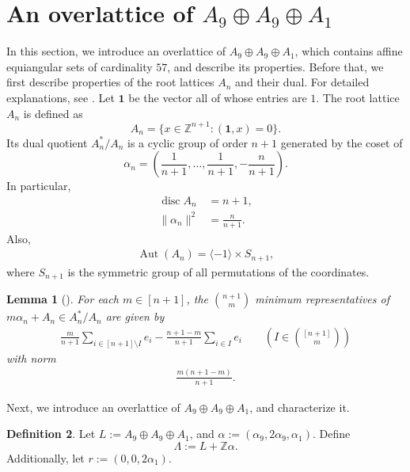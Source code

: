 \documentclass[reqno, 11pt]{amsart}
\numberwithin{equation}{section}
\newtheorem{lem}{Lemma}[section]
\theoremstyle{definition}
\newtheorem{dfn}[lem]{Definition}%
\DeclareMathOperator{\Aut}{Aut}
\DeclareMathOperator{\disc}{disc}
\newcommand{\Z}{\mathbb{Z}}
\newcommand{\allone}{\mathbf{1}}
\newcommand{\inp}[1]{( #1 )}
\begin{document}
\section{An overlattice of $A_9\oplus A_9\oplus A_1$}	\label{sec:Lambda}
In this section, we introduce an overlattice of $A_9\oplus A_9\oplus A_1$, which contains affine equiangular sets of cardinality $57$, and describe its properties.
Before that, we first describe properties of the root lattices $A_n$ and their dual.
For detailed explanations, see \cite{Conway1999, Ozeki2018}.
Let $\allone$ be the vector all of whose entries are $1$.
The root lattice $A_n$ is defined as
\[A_n=\{x\in\Z^{n+1} : \inp{\allone,x}=0\}.\]
Its dual quotient $A_n^*/A_n$ is a cyclic group of order $n+1$
generated by the coset of
\[\alpha_n=\left(\frac{1}{n+1},\dots,\frac{1}{n+1},-\frac{n}{n+1}\right).\]
In particular,
\begin{align}
	\disc A_n      & =n+1,\label{1A}               \\
	\|\alpha_n\|^2 & =\frac{n}{n+1}.\label{1alpha}
\end{align}
Also,
\begin{align}	\label{AutA}
	\Aut(A_n) = \langle -1 \rangle \times S_{n+1},
\end{align}
where $S_{n+1}$ is the symmetric group of all permutations of the coordinates.
\begin{lem}[\cite{Ozeki2018}] \label{lem:minA}
	For each $m \in [n+1]$, the $\binom{n+1}{m}$ minimum representatives of $m \alpha_n + A_n \in A_n^*/A_n$ are given by
	\begin{align}	\label{enum_min}
		\frac{m}{n+1} \sum_{i \in [n+1] \setminus I} e_i-\frac{n+1-m}{n+1} \sum_{i \in I} e_i \qquad ( I \in \binom{[n+1]}{m} )
	\end{align}
	with norm
	\begin{align} \label{min}
		\frac{m(n+1-m)}{n+1}.
	\end{align}
\end{lem}



Next, we introduce an overlattice of $A_9\oplus A_9\oplus A_1$, and characterize it.
\begin{dfn}	\label{dfn:Lambda}
	Let $L:=A_9\oplus A_9\oplus A_1$,
	and $\alpha := (\alpha_9, 2\alpha_9, \alpha_1)$.
	Define
	\begin{equation}\label{1L}
		\Lambda:=L+\Z\alpha.
	\end{equation}
	Additionally, let $r := (0,0,2\alpha_1)$.
\end{dfn}
\end{document}
